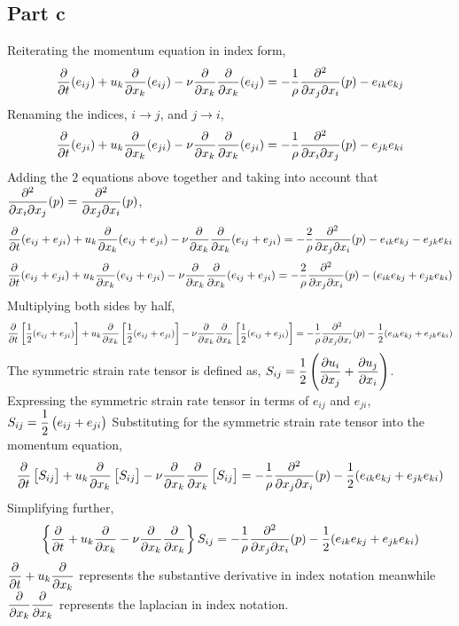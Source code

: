 \documentclass[class=report, 12pt, crop=false]{standalone}
\begin{document}
\begin{center}
\subsection{Part c}
\begin{comment}
\end{comment}
Reiterating the momentum equation in index form,
$$\frac{\partial}{\partial t}(e_{ij}) + u_k\frac{\partial }{\partial x_k}(e_{ij}) - \nu\frac{\partial}{\partial x_k}\frac{\partial}{\partial x_k}(e_{ij}) = -\frac{1}{\rho}\frac{\partial^2}{\partial x_j\partial x_i}(p) - e_{ik}e_{kj}$$
Renaming the indices, $i\to j$, and $j\to i$,
$$\frac{\partial}{\partial t}(e_{ji}) + u_k\frac{\partial }{\partial x_k}(e_{ji}) - \nu\frac{\partial}{\partial x_k}\frac{\partial}{\partial x_k}(e_{ji}) = -\frac{1}{\rho}\frac{\partial^2}{\partial x_i\partial x_j}(p) - e_{jk}e_{ki}$$
Adding the $2$ equations above together and taking into account that $\displaystyle{\frac{\partial^2}{\partial x_i\partial x_j}(p)=\frac{\partial^2}{\partial x_j\partial x_i}(p)}$,
$$\frac{\partial}{\partial t}(e_{ij} + e_{ji}) + u_k\frac{\partial }{\partial x_k}(e_{ij} + e_{ji}) - \nu\frac{\partial}{\partial x_k}\frac{\partial}{\partial x_k}(e_{ij} + e_{ji}) = -\frac{2}{\rho}\frac{\partial^2}{\partial x_j\partial x_i}(p) - e_{ik}e_{kj} - e_{jk}e_{ki}$$
$$\frac{\partial}{\partial t}(e_{ij} + e_{ji}) + u_k\frac{\partial }{\partial x_k}(e_{ij} + e_{ji}) - \nu\frac{\partial}{\partial x_k}\frac{\partial}{\partial x_k}(e_{ij} + e_{ji}) = -\frac{2}{\rho}\frac{\partial^2}{\partial x_j\partial x_i}(p) - (e_{ik}e_{kj} + e_{jk}e_{ki})$$
Multiplying both sides by half,
$$\frac{\partial}{\partial t}\left[\frac{1}{2}(e_{ij}+e_{ji})\right] + u_k\frac{\partial }{\partial x_k}\left[\frac{1}{2}(e_{ij}+e_{ji})\right] - \nu\frac{\partial}{\partial x_k}\frac{\partial}{\partial x_k}\left[\frac{1}{2}(e_{ij}+e_{ji})\right] = -\frac{1}{\rho}\frac{\partial^2}{\partial x_j\partial x_i}(p) - \frac{1}{2}(e_{ik}e_{kj}+e_{jk}e_{ki})$$
The symmetric strain rate tensor is defined as, $\displaystyle{S_{ij} = \frac{1}{2}\left(\frac{\partial u_i}{\partial x_j}+\frac{\partial u_j}{\partial x_i}\right)}$. Expressing the symmetric strain rate tensor in terms of $e_{ij}$ and $e_{ji}$, $\displaystyle{S_{ij} = \frac{1}{2}\left(e_{ij}+e_{ji}\right)}$
Substituting for the symmetric strain rate tensor into the momentum equation,
$$\frac{\partial}{\partial t}\left[S_{ij}\right] + u_k\frac{\partial }{\partial x_k}\left[S_{ij}\right] - \nu\frac{\partial}{\partial x_k}\frac{\partial}{\partial x_k}\left[S_{ij}\right] = -\frac{1}{\rho}\frac{\partial^2}{\partial x_j\partial x_i}(p) - \frac{1}{2}(e_{ik}e_{kj}+e_{jk}e_{ki})$$
Simplifying further,
$$\left\{\frac{\partial}{\partial t} + u_k\frac{\partial }{\partial x_k} - \nu\frac{\partial}{\partial x_k}\frac{\partial}{\partial x_k}\right\}S_{ij} = -\frac{1}{\rho}\frac{\partial^2}{\partial x_j\partial x_i}(p) - \frac{1}{2}(e_{ik}e_{kj}+e_{jk}e_{ki})$$
$\displaystyle{\frac{\partial}{\partial t} + u_k\frac{\partial}{\partial x_k}}$ represents the substantive derivative in index notation meanwhile $\displaystyle{\frac{\partial}{\partial x_k}\frac{\partial}{\partial x_k}}$ represents the laplacian in index notation.

\end{center}
\end{document}
